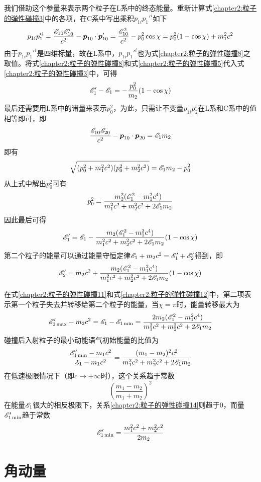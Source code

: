 我们借助这个参量来表示两个粒子在L系中的终态能量。重新计算式\eqref{chapter2:粒子的弹性碰撞3}中的各项，在C系中写出乘积$p_{1i}p_1'^i$如下
\begin{equation}
	p_{1i}p_1'^i = \frac{\mathscr{E}_{10}\mathscr{E}'_{10}}{c^2} - \boldsymbol{p}_{10}\cdot \boldsymbol{p}'_{10} = \frac{\mathscr{E}_{10}^2}{c^2} - p_0^2\cos \chi = p_0^2(1-\cos\chi)+m_1^2c^2
	\label{chapter2:粒子的弹性碰撞8}
\end{equation}
由于$p_{1i}p_1'^i$是四维标量，故在L系中，$p_{1i}p_1'^i$也为式\eqref{chapter2:粒子的弹性碰撞8}之取值。将式\eqref{chapter2:粒子的弹性碰撞8}和式\eqref{chapter2:粒子的弹性碰撞5}代入式\eqref{chapter2:粒子的弹性碰撞3}中，可得
\begin{equation}
	\mathscr{E}_1'-\mathscr{E}_1 = -\frac{p_0^2}{m_2}(1-\cos\chi)
	\label{chapter2:粒子的弹性碰撞9}
\end{equation}
最后还需要用L系中的诸量来表示$p_0^2$，为此，只需让不变量$p_{1i}p_2^i$在L系和C系中的值相等即可，即
\begin{equation*}
	\frac{\mathscr{E}_{10}\mathscr{E}_{20}}{c^2} - \boldsymbol{p}_{10}\cdot \boldsymbol{p}_{20} = \mathscr{E}_1m_2
\end{equation*}
即有
\begin{equation*}
	\sqrt{(p_0^2+m_1^2c^2)(p_0^2+m_2^2c^2)} = \mathscr{E}_1m_2 - p_0^2
\end{equation*}
从上式中解出$p_0^2$可有
\begin{equation}
	p_0^2 = \frac{m_2^2(\mathscr{E}_1^2-m_1^2c^4)}{m_1^2c^2+m_2^2c^2+2\mathscr{E}_1m_2}
	\label{chapter2:粒子的弹性碰撞10}
\end{equation}
因此最后可得
\begin{equation}
	\mathscr{E}_1' = \mathscr{E}_1 - \frac{m_2(\mathscr{E}_1^2-m_1^2c^4)}{m_1^2c^2+m_2^2c^2+2\mathscr{E}_1m_2}(1-\cos \chi)
	\label{chapter2:粒子的弹性碰撞11}
\end{equation}
第二个粒子的能量可以通过能量守恒定律$\mathscr{E}_1+m_2c^2=\mathscr{E}_1'+\mathscr{E}_2'$得到，即
\begin{equation}
	\mathscr{E}_2' = m_2c^2 + \frac{m_2(\mathscr{E}_1^2-m_1^2c^4)}{m_1^2c^2+m_2^2c^2+2\mathscr{E}_1m_2}(1-\cos \chi)
	\label{chapter2:粒子的弹性碰撞12}
\end{equation}

在式\eqref{chapter2:粒子的弹性碰撞11}和式\eqref{chapter2:粒子的弹性碰撞12}中，第二项表示第一个粒子失去并转移给第二个粒子的能量，当$\chi = \pi$时，能量转移最大为
\begin{equation}
	\mathscr{E}'_{2\max}-m_2c^2 = \mathscr{E}_1-\mathscr{E}_{1\min} = \frac{2m_2(\mathscr{E}_1^2-m_1^2c^4)}{m_1^2c^2+m_2^2c^2+2\mathscr{E}_1m_2}
	\label{chapter2:粒子的弹性碰撞13}
\end{equation}
碰撞后入射粒子的最小动能语气初始能量的比值为
\begin{equation}
	\frac{\mathscr{E}'_{1\min}-m_1c^2}{\mathscr{E}_1-m_1c^2} = \frac{(m_1-m_2)^2c^2}{m_1^2c^2+m_2^2c^2+2\mathscr{E}_1m_2}
	\label{chapter2:粒子的弹性碰撞14}
\end{equation}
在低速极限情况下（即$c\to +\infty$时），这个关系趋于常数
\begin{equation*}
	\left(\frac{m_1-m_2}{m_1+m_2}\right)^2
\end{equation*}
在能量$\mathscr{E}_1$很大的相反极限下，关系\eqref{chapter2:粒子的弹性碰撞14}则趋于$0$，而量$\mathscr{E}'_{1\min}$趋于常数
\begin{equation*}
	\mathscr{E}'_{1\min} = \frac{m_1^2c^2+m_2^2c^2}{2m_2}
\end{equation*}

\section{角动量}

